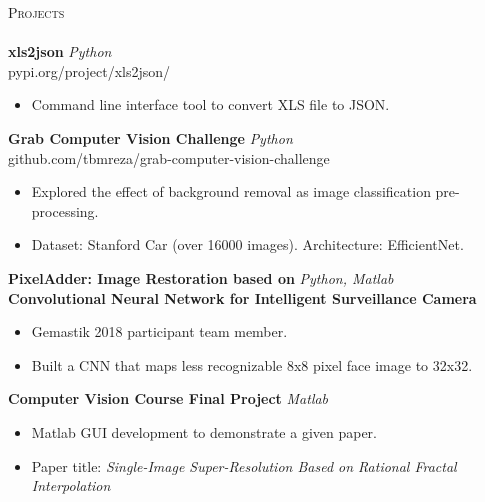 \documentclass[a4paper]{article}
\newcommand{\lineunder} {
    \vspace*{-8pt} \\
    \hspace*{-18pt} \hrulefill \\
}
\newcommand{\header} [1] {
    {\hspace*{-18pt}\vspace*{6pt} \textsc{#1}}
    \vspace*{-6pt} \lineunder
}
\begin{document}
\header{Projects}
{\textbf{xls2json}} \hfill {\sl Python}\\pypi.org/project/xls2json/\\

\vspace{-1mm}
\begin{itemize} \itemsep 1pt
	\item Command line interface tool to convert XLS file to JSON.  
\end{itemize}

\vspace*{2mm}

{\textbf{Grab Computer Vision Challenge}} \hfill {\sl Python}\\github.com/tbmreza/grab-computer-vision-challenge\\

\vspace{-1mm}
\begin{itemize} \itemsep 1pt
	\item Explored the effect of background removal as image classification pre-processing.
	\item Dataset: Stanford Car (over 16000 images). Architecture: EfficientNet.
  
\end{itemize}

\vspace*{2mm}

{\textbf{PixelAdder: Image Restoration based on
}} \hfill {\sl Python, Matlab}\\
{\textbf{Convolutional Neural Network for Intelligent Surveillance Camera}}


\vspace{-1mm}
\begin{itemize} \itemsep 1pt
	\item Gemastik 2018 participant team member.
  \item Built a CNN that maps less recognizable 8x8 pixel face image to 32x32.
  
  
\end{itemize}


\vspace*{2mm}

{\textbf{Computer Vision Course Final Project}} \hfill {\sl Matlab}\\

\vspace{-1mm}
\begin{itemize} \itemsep 1pt
	\item Matlab GUI development to demonstrate a given paper.
    \item Paper title: \textit{Single-Image Super-Resolution Based on Rational Fractal Interpolation}
  
\end{itemize}
\end{document}
